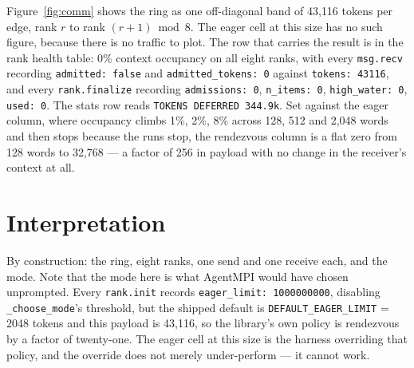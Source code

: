 \documentclass[11pt]{article}
\begin{document}
Figure~\ref{fig:comm} shows the ring as one off-diagonal band of 43{,}116 tokens per
edge, rank $r$ to rank $(r{+}1) \bmod 8$. The eager cell at this size has no such
figure, because there is no traffic to plot. The row that carries the result is in
the rank health table: 0\% context occupancy on all eight ranks, with every
\texttt{msg.recv} recording \texttt{admitted: false} and \texttt{admitted\_tokens: 0}
against \texttt{tokens: 43116}, and every \texttt{rank.finalize} recording
\texttt{admissions: 0}, \texttt{n\_items: 0}, \texttt{high\_water: 0}, \texttt{used:
0}. The stats row reads \texttt{TOKENS DEFERRED 344.9k}. Set against the eager
column, where occupancy climbs 1\%, 2\%, 8\% across 128, 512 and 2{,}048 words and
then stops because the runs stop, the rendezvous column is a flat zero from 128 words
to 32{,}768 --- a factor of 256 in payload with no change in the receiver's context
at all.

\section{Interpretation}

By construction: the ring, eight ranks, one send and one receive each, and the mode.
Note that the mode here is what AgentMPI would have chosen unprompted. Every
\texttt{rank.init} records \texttt{eager\_limit: 1000000000}, disabling
\texttt{\_choose\_mode}'s threshold, but the shipped default is
\texttt{DEFAULT\_EAGER\_LIMIT} = 2048 tokens and this payload is 43{,}116, so the
library's own policy is rendezvous by a factor of twenty-one. The eager cell at this
size is the harness overriding that policy, and the override does not merely
under-perform --- it cannot work.
\end{document}
